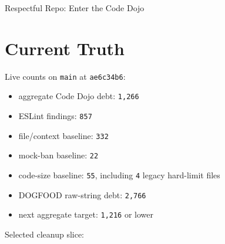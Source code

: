 \begin{CodeBlock}
Respectful Repo: Enter the Code Dojo
\end{CodeBlock}

\section{Current Truth}\label{record-231-current-truth}

Live counts on \texttt{m\allowbreak{}a\allowbreak{}i\allowbreak{}n} at \texttt{a\allowbreak{}e\allowbreak{}6\allowbreak{}c\allowbreak{}3\allowbreak{}4\allowbreak{}b\allowbreak{}6}:

\begin{itemize}
\tightlist
\item
  aggregate Code Dojo debt: \texttt{1\allowbreak{},\allowbreak{}2\allowbreak{}6\allowbreak{}6}
\item
  ESLint findings: \texttt{8\allowbreak{}5\allowbreak{}7}
\item
  file/context baseline: \texttt{3\allowbreak{}3\allowbreak{}2}
\item
  mock-ban baseline: \texttt{2\allowbreak{}2}
\item
  code-size baseline: \texttt{5\allowbreak{}5}, including \texttt{4} legacy hard-limit files
\item
  DOGFOOD raw-string debt: \texttt{2\allowbreak{},\allowbreak{}7\allowbreak{}6\allowbreak{}6}
\item
  next aggregate target: \texttt{1\allowbreak{},\allowbreak{}2\allowbreak{}1\allowbreak{}6} or lower
\end{itemize}

Selected cleanup slice:

